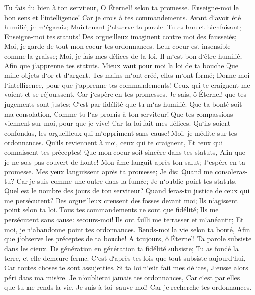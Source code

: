 \verse Tu fais du bien à ton serviteur, O Éternel! selon ta promesse. 
\verse Enseigne-moi le bon sens et l`intelligence! Car je crois à tes commandements. 
\verse Avant d`avoir été humilié, je m`égarais; Maintenant j`observe ta parole. 
\verse Tu es bon et bienfaisant; Enseigne-moi tes statuts! 
\verse Des orgueilleux imaginent contre moi des faussetés; Moi, je garde de tout mon coeur tes ordonnances. 
\verse Leur coeur est insensible comme la graisse; Moi, je fais mes délices de ta loi. 
\verse Il m`est bon d`être humilié, Afin que j`apprenne tes statuts. 
\verse Mieux vaut pour moi la loi de ta bouche Que mille objets d`or et d`argent. 
\verse Tes mains m`ont créé, elles m`ont formé; Donne-moi l`intelligence, pour que j`apprenne tes commandements! 
\verse Ceux qui te craignent me voient et se réjouissent, Car j`espère en tes promesses. 
\verse Je sais, ô Éternel! que tes jugements sont justes; C`est par fidélité que tu m`as humilié. 
\verse Que ta bonté soit ma consolation, Comme tu l`as promis à ton serviteur! 
\verse Que tes compassions viennent sur moi, pour que je vive! Car ta loi fait mes délices. 
\verse Qu`ils soient confondus, les orgueilleux qui m`oppriment sans cause! Moi, je médite sur tes ordonnances. 
\verse Qu`ils reviennent à moi, ceux qui te craignent, Et ceux qui connaissent tes préceptes! 
\verse Que mon coeur soit sincère dans tes statuts, Afin que je ne sois pas couvert de honte! 
\verse Mon âme languit après ton salut; J`espère en ta promesse. 
\verse Mes yeux languissent après ta promesse; Je dis: Quand me consoleras-tu? 
\verse Car je suis comme une outre dans la fumée; Je n`oublie point tes statuts. 
\verse Quel est le nombre des jours de ton serviteur? Quand feras-tu justice de ceux qui me persécutent? 
\verse Des orgueilleux creusent des fosses devant moi; Ils n`agissent point selon ta loi. 
\verse Tous tes commandements ne sont que fidélité; Ils me persécutent sans cause: secours-moi! 
\verse Ils ont failli me terrasser et m`anéantir; Et moi, je n`abandonne point tes ordonnances. 
\verse Rends-moi la vie selon ta bonté, Afin que j`observe les préceptes de ta bouche! 
\verse A toujours, ô Éternel! Ta parole subsiste dans les cieux. 
\verse De génération en génération ta fidélité subsiste; Tu as fondé la terre, et elle demeure ferme. 
\verse C`est d`après tes lois que tout subsiste aujourd`hui, Car toutes choses te sont assujetties. 
\verse Si ta loi n`eût fait mes délices, J`eusse alors péri dans ma misère. 
\verse Je n`oublierai jamais tes ordonnances, Car c`est par elles que tu me rends la vie. 
\verse Je suis à toi: sauve-moi! Car je recherche tes ordonnances. 
